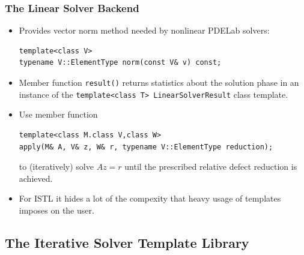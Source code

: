 \begin{frame}[fragile]
  \frametitle<presentation>{The Linear Solver Backend}
  \begin{itemize}
  \item Provides vector norm method needed by nonlinear PDELab solvers:
      \begin{lstlisting}
template<class V>
typename V::ElementType norm(const V& v) const;
      \end{lstlisting}
    \item Member function \lstinline!result()! returns statistics
      about the solution phase in an instance of the
      \lstinline!template<class T> LinearSolverResult! class template.
\item Use member function 
  \begin{lstlisting}
template<class M.class V,class W>
apply(M& A, V& z, W& r, typename V::ElementType reduction);
  \end{lstlisting}
  to (iteratively) solve $Az=r$ until the prescribed relative defect
  reduction is achieved.
  \item For ISTL it hides a lot of the compexity that heavy usage of
    templates imposes on the user.
  \end{itemize}
\end{frame}

\subsection{The Iterative Solver Template Library}
\label{sec:iter-solv-templ}

